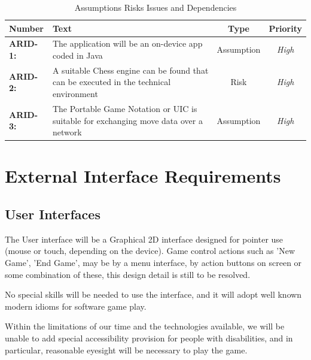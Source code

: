 \documentclass[a4paper,10pt]{article}
\begin{document}
\begin{table}[h]
\caption{Assumptions Risks Issues and Dependencies \label{table:ast}}


\begin{tabular}{|| l | p{10.5cm}  |  c  | c ||} \hline  

\textbf{Number} & \textbf{Text} & \textbf{Type} & \textbf{Priority}\\ \hline

\textbf{ARID-1:}  & 
The application will be an on-device app coded in Java
& Assumption & \textit{ High} \\

\textbf{ARID-2:}  & 
A suitable Chess engine can be found that can be executed in the technical environment
& Risk & \textit{ High} \\

\textbf{ARID-3:}  & 
The Portable Game Notation \cite{PGN-94} or UIC \cite{UCIInterface} is suitable for exchanging move data over a network
& Assumption & \textit{ High} \\

\hline
\end{tabular}

\end{table}




\section{External Interface Requirements}
\subsection{User Interfaces}

The User interface will be a Graphical 2D interface designed for pointer use (mouse or touch, depending on the device). Game control actions such as 'New Game', 'End Game', may be by a menu interface, by action buttons on screen or some combination of these, this design detail is still to be resolved. 

No special skills will be needed to use the interface, and it will adopt well known modern idioms for software game play.

Within the limitations of our time and the technologies available, we will be unable to add special accessibility provision for people with disabilities, and in particular, reasonable eyesight will be necessary to play the game. 
\end{document}
